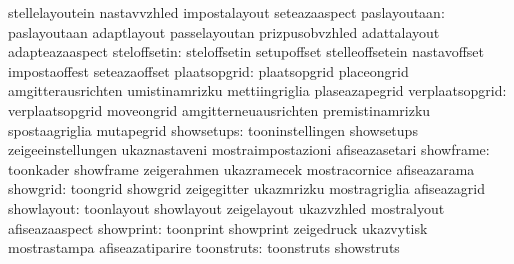                                   stellelayoutein                  nastavvzhled
                                  impostalayout                    seteazaaspect
                    paslayoutaan: paslayoutaan                     adaptlayout
                                  passelayoutan                    prizpusobvzhled
                                  adattalayout                     adapteazaaspect
                    steloffsetin: steloffsetin                     setupoffset
                                  stelleoffsetein                  nastavoffset
                                  impostaoffest                    seteazaoffset
                    plaatsopgrid: plaatsopgrid                     placeongrid
                                  amgitterausrichten               umistinamrizku
                                  mettiingriglia                   plaseazapegrid
                 verplaatsopgrid: verplaatsopgrid                  moveongrid
                                  amgitterneuausrichten            premistinamrizku
                                  spostaagriglia                   mutapegrid
                      showsetups: tooninstellingen                 showsetups
                                  zeigeeinstellungen               ukaznastaveni
                                  mostraimpostazioni               afiseazasetari
                       showframe: toonkader                        showframe
                                  zeigerahmen                      ukazramecek
                                  mostracornice                    afiseazarama
                        showgrid: toongrid                         showgrid
                                  zeigegitter                      ukazmrizku
                                  mostragriglia                    afiseazagrid
                      showlayout: toonlayout                       showlayout
                                  zeigelayout                      ukazvzhled
                                  mostralyout                      afiseazaaspect
                       showprint: toonprint                        showprint
                                  zeigedruck                       ukazvytisk
                                  mostrastampa                     afiseazatiparire
                      toonstruts: toonstruts                       showstruts
